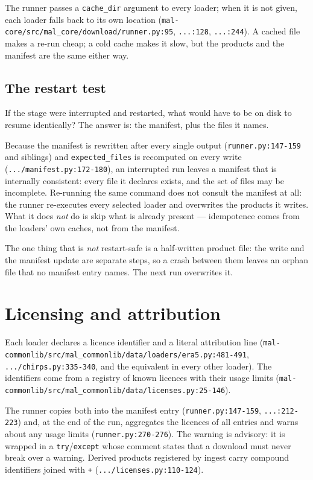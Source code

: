 \documentclass[11pt,a4paper]{article}
\newcommand{\code}[1]{\texttt{#1}}
\begin{document}
The runner passes a \code{cache\_dir} argument to every loader; when it is
not given, each loader falls back to its own location
(\code{mal-core/src/mal\_core/download/runner.py:95},
\code{...:128}, \code{...:244}). A cached file makes a re-run cheap; a cold
cache makes it slow, but the products and the manifest are the same either
way.

\subsection{The restart test}

If the stage were interrupted and restarted, what would have to be on disk to
resume identically? The answer is: the manifest, plus the files it names.

Because the manifest is rewritten after every single output
(\code{runner.py:147-159} and siblings) and \code{expected\_files} is
recomputed on every write (\code{.../manifest.py:172-180}), an interrupted
run leaves a manifest that is internally consistent: every file it declares
exists, and the set of files may be incomplete. Re-running the same command
does not consult the manifest at all: the runner re-executes every selected
loader and overwrites the products it writes. What it does \emph{not} do is
skip what is already present --- idempotence comes from the loaders' own
caches, not from the manifest.

The one thing that is \emph{not} restart-safe is a half-written product file:
the write and the manifest update are separate steps, so a crash between them
leaves an orphan file that no manifest entry names. The next run overwrites
it.

\section{Licensing and attribution}

Each loader declares a licence identifier and a literal attribution line
(\code{mal-commonlib/src/mal\_commonlib/data/loaders/era5.py:481-491},
\code{.../chirps.py:335-340}, and the equivalent in every other loader).
The identifiers come from a registry of known licences with their usage
limits (\code{mal-commonlib/src/mal\_commonlib/data/licenses.py:25-146}).

The runner copies both into the manifest entry
(\code{runner.py:147-159}, \code{...:212-223}) and, at the end of the run,
aggregates the licences of all entries and warns about any usage limits
(\code{runner.py:270-276}). The warning is advisory: it is wrapped in a
\code{try}/\code{except} whose comment states that a download must never
break over a warning. Derived products registered by ingest carry compound
identifiers joined with \code{+} (\code{.../licenses.py:110-124}).
\end{document}
